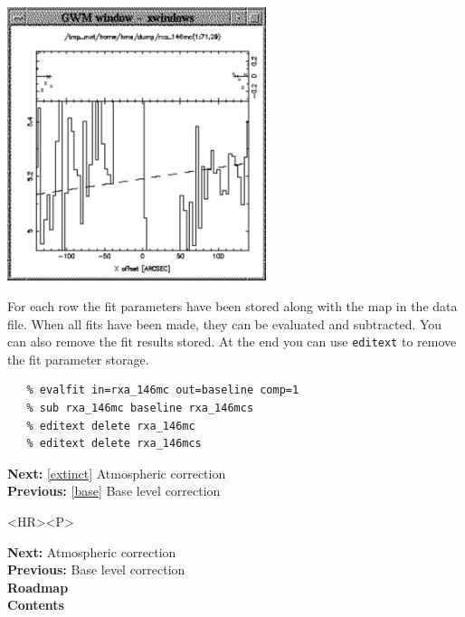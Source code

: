 \documentclass[11pt]{article}
\newcommand{\htmladdimg}[1]{}
\newenvironment{latexonly}{}{}
\newcommand{\htmlref}[2]{#1}
\newcommand{\xref}[3]{#1}
\begin{document}
\begin{latexonly}
\begin{center}
\leavevmode\includegraphics[height=80mm]{sc1_fitcheby}
\end{center}
\end{latexonly}
\htmladdimg{addon/fitcheby.gif}

   For each row the fit parameters have been stored along with the map
   in the data file. When all fits have been made, they can be evaluated
   and subtracted. You can also remove the fit results stored. At the
   end you can use
{\tt \xref{editext}{sun140}{EDITEXT}}
   to remove the fit parameter storage.

\begin{verbatim}
   % evalfit in=rxa_146mc out=baseline comp=1
   % sub rxa_146mc baseline rxa_146mcs
   % editext delete rxa_146mc
   % editext delete rxa_146mcs
\end{verbatim}

\begin{latexonly}
{\bf Next:} \ref{extinct} Atmospheric correction\\
{\bf Previous:} \ref{base} Base level correction\\
\end{latexonly}

\begin{htmlonly}
\begin{rawhtml} <HR><P> \end{rawhtml}
{\bf \htmlref{Next:}{extinct}} Atmospheric correction\\
{\bf \htmlref{Previous:}{base}} Base level correction\\
{\bf \htmlref{Roadmap}{roadmap}}\\
{\bf \htmlref{Contents}{stardoccontents}}\\
\end{htmlonly}
\end{document}
